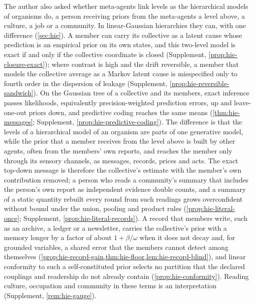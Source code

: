 The author also asked whether meta-agents link levels as the hierarchical models of organisms do, a person receiving priors from the meta-agents a level above, a culture, a job or a community. In linear-Gaussian hierarchies they can, with one difference (\cref{sec:hie}). A member can carry its collective as a latent cause whose prediction is an empirical prior on its own states, and this two-level model is exact if and only if the collective coordinate is closed (Supplement, \cref{prop:hie-closure-exact}); where contrast is high and the drift reversible, a member that models the collective average as a Markov latent cause is misspecified only to fourth order in the dispersion of leakage (Supplement, \cref{prop:hie-reversible-sandwich}). On the Gaussian tree of a collective and its members, exact inference passes likelihoods, equivalently precision-weighted prediction errors, up and leave-one-out priors down, and predictive coding reaches the same means (\cref{thm:hie-messages}; Supplement, \cref{prop:hie-predictive-coding}). The difference is that the levels of a hierarchical model of an organism are parts of one generative model, while the prior that a member receives from the level above is built by other agents, often from the members' own reports, and reaches the member only through its sensory channels, as messages, records, prices and acts. The exact top-down message is therefore the collective's estimate with the member's own contribution removed; a person who reads a community's summary that includes the person's own report as independent evidence double counts, and a summary of a static quantity rebuilt every round from such readings grows overconfident without bound under the union, pooling and product rules (\cref{prop:hie-literal-once}; Supplement, \cref{prop:hie-literal-records}). A record that members write, such as an archive, a ledger or a newsletter, carries the collective's prior with a memory longer by a factor of about $1+\beta/\omega$ when it does not decay and, for grounded variables, a shared error that the members cannot detect among themselves (\cref{prop:hie-record-gain,thm:hie-floor,lem:hie-record-blind}), and linear conformity to such a self-constituted prior selects no partition that the declared couplings and readership do not already contain (\cref{prop:hie-conformity}). Reading culture, occupation and community in these terms is an interpretation (Supplement, \cref{rem:hie-gauge}).

